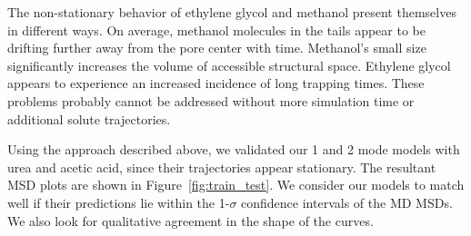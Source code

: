 \documentclass{article}
\begin{document}
  The non-stationary behavior of ethylene glycol and methanol present themselves
  in different ways. On average, methanol molecules in the tails appear to be 
  drifting further away from the pore center with time. Methanol's small size 
  significantly increases the volume of accessible structural space. Ethylene 
  glycol appears to experience an increased incidence of long trapping times. 
  These problems probably cannot be addressed without more simulation time or 
  additional solute trajectories. 

  Using the approach described above, we validated our 1 and 2 mode models with
  urea and acetic acid, since their trajectories appear stationary. The 
  resultant MSD plots are shown in Figure~\ref{fig:train_test}. We consider 
  our models to match well if their predictions lie within the 1-$\sigma$
  confidence intervals of the MD MSDs. We also look for qualitative agreement
  in the shape of the curves.
  
\end{document}
